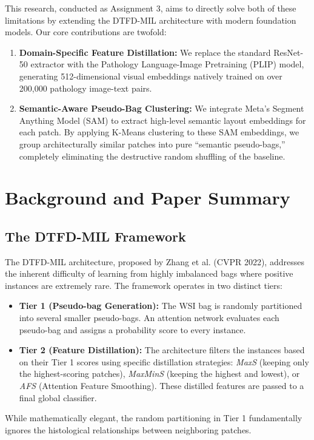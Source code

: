 \documentclass[12pt, a4paper]{article}
\begin{document}
This research, conducted as Assignment 3, aims to directly solve both of these limitations by extending the DTFD-MIL architecture with modern foundation models. Our core contributions are twofold:
\begin{enumerate}
    \item \textbf{Domain-Specific Feature Distillation:} We replace the standard ResNet-50 extractor with the Pathology Language-Image Pretraining (PLIP) model, generating 512-dimensional visual embeddings natively trained on over 200,000 pathology image-text pairs.
    \item \textbf{Semantic-Aware Pseudo-Bag Clustering:} We integrate Meta's Segment Anything Model (SAM) to extract high-level semantic layout embeddings for each patch. By applying K-Means clustering to these SAM embeddings, we group architecturally similar patches into pure ``semantic pseudo-bags,'' completely eliminating the destructive random shuffling of the baseline.
\end{enumerate}

\section{Background and Paper Summary}
\subsection{The DTFD-MIL Framework}
The DTFD-MIL architecture, proposed by Zhang et al. (CVPR 2022), addresses the inherent difficulty of learning from highly imbalanced bags where positive instances are extremely rare. The framework operates in two distinct tiers:
\begin{itemize}
    \item \textbf{Tier 1 (Pseudo-bag Generation):} The WSI bag is randomly partitioned into several smaller pseudo-bags. An attention network evaluates each pseudo-bag and assigns a probability score to every instance.
    \item \textbf{Tier 2 (Feature Distillation):} The architecture filters the instances based on their Tier 1 scores using specific distillation strategies: \textit{MaxS} (keeping only the highest-scoring patches), \textit{MaxMinS} (keeping the highest and lowest), or \textit{AFS} (Attention Feature Smoothing). These distilled features are passed to a final global classifier.
\end{itemize}
While mathematically elegant, the random partitioning in Tier 1 fundamentally ignores the histological relationships between neighboring patches.
\end{document}
